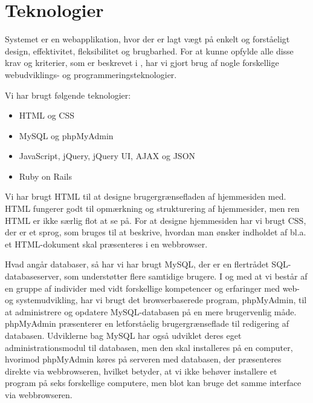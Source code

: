 \section{Teknologier}
\label{sec:teknologier}
Systemet er en webapplikation, hvor der er lagt vægt på enkelt og forståeligt design, effektivitet, fleksibilitet og brugbarhed. For at kunne opfylde alle disse krav og kriterier, som er beskrevet i , har vi gjort brug af nogle forskellige webudviklings- og programmeringsteknologier.

Vi har brugt følgende teknologier:

\begin{itemize}[noitemsep]
\item HTML og CSS
\item MySQL og phpMyAdmin
\item JavaScript, jQuery, jQuery UI, AJAX og JSON
\item Ruby on Rails
\end{itemize}

Vi har brugt HTML\cite{htmlwiki} til at designe brugergrænsefladen af hjemmesiden med. HTML fungerer godt til opmærkning og strukturering af hjemmesider, men ren HTML er ikke særlig flot at se på. For at designe hjemmesiden har vi brugt CSS\cite{csswiki}, der er et sprog, som bruges til at beskrive, hvordan man ønsker indholdet af bl.a. et HTML-dokument skal præsenteres i \fx en webbrowser.

Hvad angår databaser, så har vi har brugt MySQL\cite{mysqlwiki}, der er en flertrådet SQL-databaseserver, som understøtter flere samtidige brugere. I og med at vi består af en gruppe af individer med vidt forskellige kompetencer og erfaringer med web- og systemudvikling, har vi brugt det browserbaserede program, phpMyAdmin\cite{phpmyadmin}, til at administrere og opdatere MySQL-databasen på en mere brugervenlig måde. phpMyAdmin præsenterer en letforståelig brugergrænseflade til redigering af databasen. Udviklerne bag MySQL har også udviklet deres eget administrationsmodul til databasen, men den skal installeres på en computer, hvorimod phpMyAdmin køres på serveren med databasen, der præsenteres direkte via webbrowseren, hvilket betyder, at vi ikke behøver installere et program på seks forskellige computere, men blot kan bruge det samme interface via webbrowseren.

